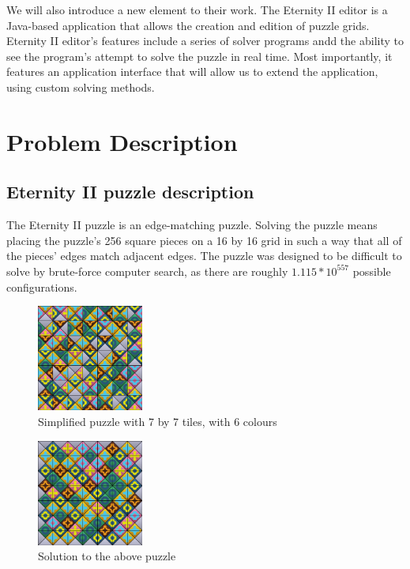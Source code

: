 \documentclass{llncs}
\begin{document}
We will also introduce a new element to their work. The Eternity II editor is a Java-based application that allows the creation and edition of puzzle grids. Eternity II editor's features include a series of solver programs andd the ability to see the program's attempt to solve the puzzle in real time. Most importantly, it features an application interface that will allow us to extend the application, using custom solving methods.

\section{Problem Description}

\subsection{Eternity II puzzle description}

The Eternity II puzzle is an edge-matching puzzle. Solving the puzzle means placing the puzzle's 256 square pieces on a 16 by 16  grid in such a way that all of the pieces' edges match adjacent edges. The puzzle was designed to be difficult to solve by brute-force computer search, as there are roughly $1.115 * 10 ^ 557$ possible configurations.

\begin{figure}[h]
	\centering
	\includegraphics[width=35mm]{images/shuffled.png}
	\caption{Simplified puzzle with 7 by 7 tiles, with 6 colours}
	\label{fig:shuffled_example}
\end{figure}

\begin{figure}[h]
	\centering
	\includegraphics[width=35mm]{images/solved.png}
	\caption{Solution to the above puzzle}
	\label{fig:solved_example}
\end{figure}
\end{document}
